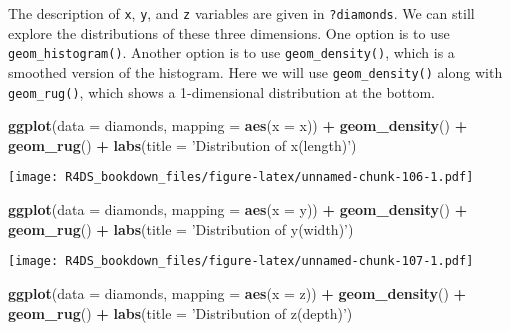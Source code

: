\documentclass[]{article}
\newenvironment{Shaded}{\begin{snugshade}}{\end{snugshade}}
\newcommand{\KeywordTok}[1]{\textcolor[rgb]{0.13,0.29,0.53}{\textbf{#1}}}
\newcommand{\DataTypeTok}[1]{\textcolor[rgb]{0.13,0.29,0.53}{#1}}
\newcommand{\StringTok}[1]{\textcolor[rgb]{0.31,0.60,0.02}{#1}}
\newcommand{\OperatorTok}[1]{\textcolor[rgb]{0.81,0.36,0.00}{\textbf{#1}}}
\newcommand{\NormalTok}[1]{#1}
\theoremstyle{definition}
\theoremstyle{definition}
\theoremstyle{definition}
\theoremstyle{remark}
\begin{document}
The description of \texttt{x}, \texttt{y}, and \texttt{z} variables are
given in \texttt{?diamonds}. We can still explore the distributions of
these three dimensions. One option is to use \texttt{geom\_histogram()}.
Another option is to use \texttt{geom\_density()}, which is a smoothed
version of the histogram. Here we will use \texttt{geom\_density()}
along with \texttt{geom\_rug()}, which shows a 1-dimensional
distribution at the bottom.

\begin{Shaded}
\begin{Highlighting}[]
\KeywordTok{ggplot}\NormalTok{(}\DataTypeTok{data =}\NormalTok{ diamonds, }\DataTypeTok{mapping =} \KeywordTok{aes}\NormalTok{(}\DataTypeTok{x =}\NormalTok{ x)) }\OperatorTok{+}
\StringTok{  }\KeywordTok{geom_density}\NormalTok{() }\OperatorTok{+}\StringTok{ }
\StringTok{  }\KeywordTok{geom_rug}\NormalTok{() }\OperatorTok{+}
\StringTok{  }\KeywordTok{labs}\NormalTok{(}\DataTypeTok{title =} \StringTok{'Distribution of x(length)'}\NormalTok{)}
\end{Highlighting}
\end{Shaded}

\texttt{[image: R4DS\_bookdown\_files/figure-latex/unnamed-chunk-106-1.pdf]}

\begin{Shaded}
\begin{Highlighting}[]
\KeywordTok{ggplot}\NormalTok{(}\DataTypeTok{data =}\NormalTok{ diamonds, }\DataTypeTok{mapping =} \KeywordTok{aes}\NormalTok{(}\DataTypeTok{x =}\NormalTok{ y)) }\OperatorTok{+}
\StringTok{  }\KeywordTok{geom_density}\NormalTok{() }\OperatorTok{+}
\StringTok{  }\KeywordTok{geom_rug}\NormalTok{() }\OperatorTok{+}
\StringTok{  }\KeywordTok{labs}\NormalTok{(}\DataTypeTok{title =} \StringTok{'Distribution of y(width)'}\NormalTok{)}
\end{Highlighting}
\end{Shaded}

\texttt{[image: R4DS\_bookdown\_files/figure-latex/unnamed-chunk-107-1.pdf]}

\begin{Shaded}
\begin{Highlighting}[]
\KeywordTok{ggplot}\NormalTok{(}\DataTypeTok{data =}\NormalTok{ diamonds, }\DataTypeTok{mapping =} \KeywordTok{aes}\NormalTok{(}\DataTypeTok{x =}\NormalTok{ z)) }\OperatorTok{+}
\StringTok{  }\KeywordTok{geom_density}\NormalTok{() }\OperatorTok{+}\StringTok{ }
\StringTok{  }\KeywordTok{geom_rug}\NormalTok{() }\OperatorTok{+}
\StringTok{  }\KeywordTok{labs}\NormalTok{(}\DataTypeTok{title =} \StringTok{'Distribution of z(depth)'}\NormalTok{)}
\end{Highlighting}
\end{Shaded}
\end{document}
